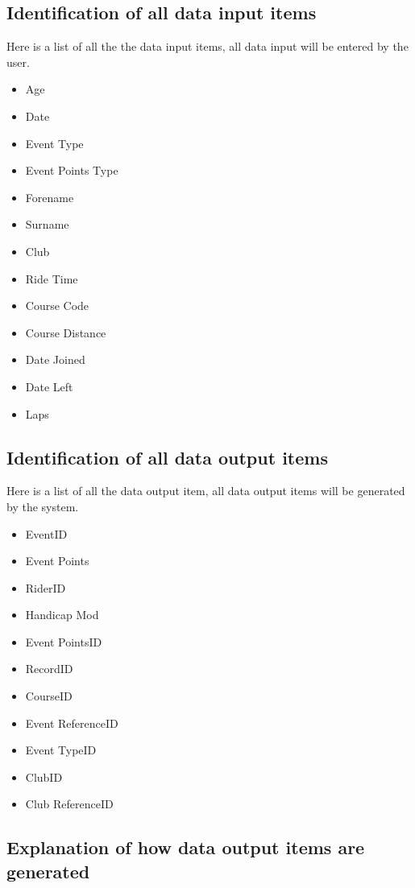 \subsection{Identification of all data input items}
Here is a list of all the the data input items, all data input will be entered by the user.

\begin{itemize}
\item Age
\item Date
\item Event Type
\item Event Points Type
\item Forename
\item Surname
\item Club
\item Ride Time
\item Course Code
\item Course Distance
\item Date Joined
\item Date Left
\item Laps
\end{itemize}

\subsection{Identification of all data output items}
Here is a list of all the data output item, all data output items will be generated by the system.

\begin{itemize}
\item EventID
\item Event Points
\item RiderID
\item Handicap Mod
\item Event PointsID
\item RecordID
\item CourseID
\item Event ReferenceID
\item Event TypeID
\item ClubID
\item Club ReferenceID
\end{itemize}

\subsection{Explanation of how data output items are generated}

